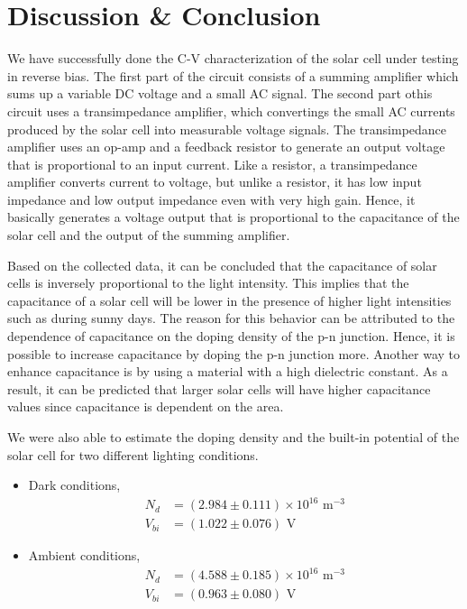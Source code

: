 \section{Discussion \& Conclusion}

We have successfully done the C-V characterization of the solar cell under testing in reverse bias. The first part of the circuit consists of a summing amplifier which sums up a variable DC voltage and a small AC signal. The second part othis circuit uses a transimpedance amplifier, which convertings the small AC currents produced by the solar cell into measurable voltage signals. 
The transimpedance amplifier uses an op-amp and a feedback resistor to generate an output voltage that is proportional to an input current.
Like a resistor, a transimpedance amplifier converts current to voltage, but unlike a resistor, it has low input impedance and low output impedance even with very high gain.
Hence, it basically generates a voltage output that is proportional to the capacitance of the solar cell and the output of the summing amplifier.

Based on the collected data, it can be concluded that the capacitance of solar cells is inversely proportional to the light intensity. This implies that the capacitance of a solar cell will be lower in the presence of higher light intensities such as during sunny days. The reason for this behavior can be attributed to the dependence of capacitance on the doping density of the p-n junction. Hence, it is possible to increase capacitance by doping the p-n junction more. Another way to enhance capacitance is by using a material with a high dielectric constant. As a result, it can be predicted that larger solar cells will have higher capacitance values since capacitance is dependent on the area.

We were also able to estimate the doping density and the built-in potential of the solar cell for two different lighting conditions.

\begin{itemize}
    \item Dark conditions,
    \begin{align*}
        N_d &= (2.984 \pm 0.111)  \times 10^{16} \text{ m}^{-3}\\
        V_{bi} &= (1.022 \pm 0.076) \text{ V}
    \end{align*}
    \item Ambient conditions,
    \begin{align*}
        N_d &= (4.588 \pm 0.185)  \times 10^{16} \text{ m}^{-3}\\
        V_{bi} &= (0.963 \pm 0.080) \text{ V}
    \end{align*}
\end{itemize}

